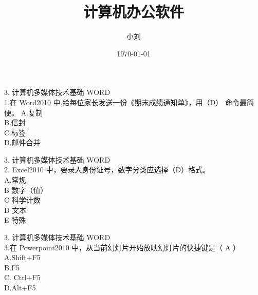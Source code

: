 \documentclass[aspectratio=169]{beamer}
\begin{document}
%
%

\title{计算机办公软件}
\author{小刘}
\date{\today}

\begin{frame}
\titlepage
\end{frame}


\begin{frame}[t]{3. 计算机多媒体技术基础} \vspace{20pt}
    WORD\\
    1.在 Word2010 中,给每位家长发送一份《期末成绩通知单》，用（D）
    命令最简便。
    A.复制\\
    B.信封\\
    C.标签\\
    D.邮件合并\\

\end{frame}

\begin{frame}[t]{3. 计算机多媒体技术基础} \vspace{20pt}
    WORD\\


2. Excel2010 中，要录入身份证号，数字分类应选择（D）格式。\\
A.常规 \\
    B 数字（值）\\
    C 科学计数\\ D 文本\\ E 特殊\\

\end{frame}

\begin{frame}[t]{3. 计算机多媒体技术基础} \vspace{20pt}
    WORD\\

3.在 Powerpoint2010 中，从当前幻灯片开始放映幻灯片的快捷键是（ A ）\\
A.Shift+F5\\ B.F5\\ C. Ctrl+F5\\ D.Alt+F5\\

\end{frame}
\end{document}
